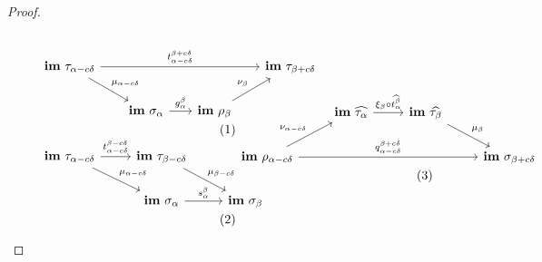 \begin{proof}
  \vspace{3ex}
  \begin{scriptsize}
  \begin{subequations}
  \begin{minipage}{0.45\textwidth}
  \begin{equation}\label{dgm:intr_tight2a}\begin{tikzcd}[column sep=scriptsize]
    \im~\tau_{\alpha-c\of}  \arrow[to=Fb, "t_{\alpha-c\of}^{\beta+c\of}"]
                      \arrow[to=Ga, "\mu_{\alpha-c\of}"]
    & & & |[alias=Fb]|
      \im~\tau_{\beta+c\of} \\
    & |[alias=Ga]|
    \im~\sigma_\alpha \arrow[to=Gb, "g_\alpha^\beta"]
    & |[alias=Gb]|
      \im~\rho_\beta \arrow[to=Fb, "\nu_\beta"] &
  \end{tikzcd}\end{equation}
  \begin{equation}\label{dgm:intr_tight2b}\begin{tikzcd}
    \im~\tau_{\alpha-c\of}  \arrow[to=Fb, "t_{\alpha-c\of}^{\beta-c\of}"]
                      \arrow[to=Ga, "\mu_{\alpha-c\of}"]
    & |[alias=Fb]|
      \im~\tau_{\beta-c\of} \arrow[to=Gb, "\mu_{\beta -c\of}"] \\
    & |[alias=Ga]|
    \im~\sigma_\alpha \arrow[to=Gb, "s_\alpha^\beta"]
    & |[alias=Gb]|
      \im~\sigma_\beta
  \end{tikzcd}\end{equation}
  \end{minipage}
  \begin{minipage}{0.45\textwidth}
  \begin{equation}\label{dgm:intr_tight2c}\begin{tikzcd}
    & |[alias=Fa]|
    \im~\ext{\tau_\alpha}  \arrow[to=Fb, "\xi_\beta\circ\ext{t_\alpha^\beta}"]
    & |[alias=Fb]|
      \im~\ext{\tau_\beta}  \arrow[to=Gb, "\mu_\beta"] & \\
    \im~\rho_{\alpha-c\of}  \arrow[to=Gb, "q_{\alpha-c\of}^{\beta+c\of}"]
                      \arrow[to=Fa, "\nu_{\alpha-c\of}"]
    & & & |[alias=Gb]|
      \im~\sigma_{\beta + c\of}
  \end{tikzcd}\end{equation}

\end{minipage}
\end{subequations}
\end{scriptsize}
\end{proof}
